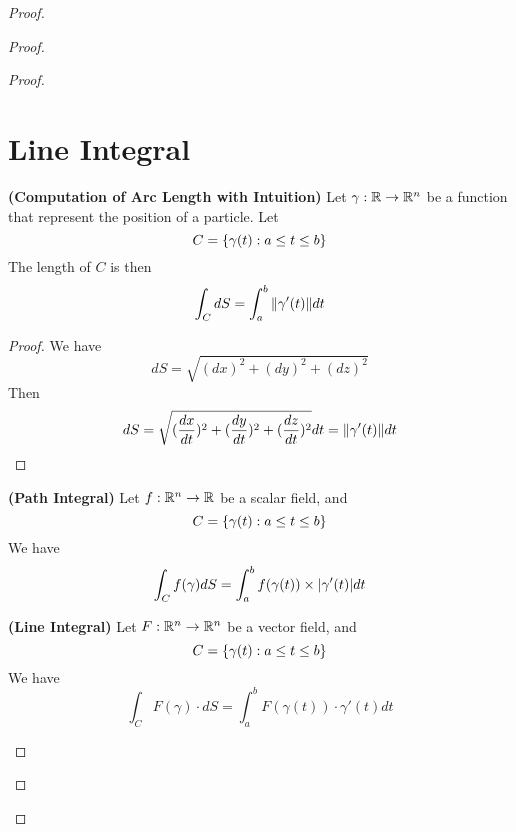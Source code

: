 \documentclass{report}
\begin{document}
\begin{proof}
\begin{proof}
\begin{proof}
\section{Line Integral}
\begin{theorem}
\label{7.1.1}
\textbf{(Computation of Arc Length with Intuition)} Let  $\gamma:\mathbb{R}\rightarrow \mathbb{R}^n$ be a function that represent the position of a particle. Let
\begin{equation}
C=\{ \gamma (t):a\leq t\leq b \}
\end{equation}
The length of $C$ is then
 \begin{equation}
\int_C dS=\int_a^b  \| \gamma '(t) \|dt
\end{equation}
\end{theorem}
\begin{proof}
We have
\begin{equation}
  dS=\sqrt{(dx)^2+(dy)^2+(dz)^2}
\end{equation}
Then 
\begin{equation}
dS=\sqrt{(\frac{dx}{dt})^2+(\frac{dy}{dt})^2+(\frac{dz}{dt})^2}dt=\| \gamma '(t) \|dt
\end{equation}
\end{proof}
\begin{corollary}
\label{7.1.2}
\textbf{(Path Integral)} Let $f:\mathbb{R}^n\rightarrow \mathbb{R}$ be a scalar field, and 
\begin{equation}
C=\{ \gamma (t):a\leq t\leq b \}
\end{equation}
We have
\begin{equation}
\int_C f(\gamma )dS=\int_a^b f(\gamma (t)) \times |\gamma '(t)|dt
\end{equation}
\end{corollary}
\begin{corollary}
\label{7.1.3}
\textbf{(Line Integral)} Let $F:\mathbb{R}^n\rightarrow \mathbb{R}^n$ be a vector field, and
\begin{equation}
C=\{ \gamma (t):a\leq t\leq  b \}
\end{equation}
We have
\begin{equation}
\int_C F(\gamma )\cdot dS =\int_a^b F(\gamma (t)) \cdot \gamma '(t)dt
\end{equation}
\end{corollary}
\end{proof}
\end{proof}
\end{proof}
\end{document}

